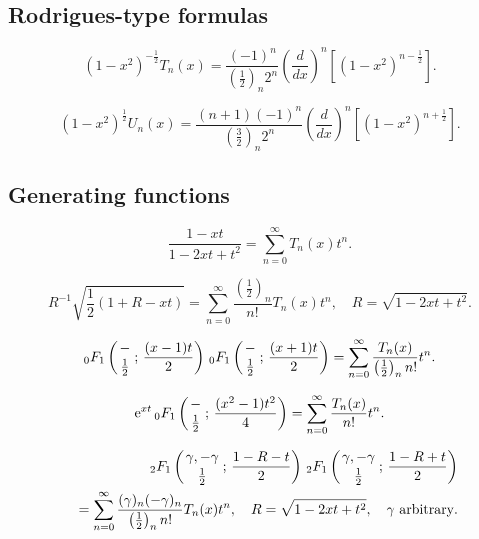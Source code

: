 \documentclass[envcountchap,graybox]{svmono}
\newcommand{\hyp}[5]{\mbox{}_{#1}{F}_{#2}
\left(\genfrac{}{}{0pt}{}{#3}{#4}\,;\,#5\right)}
\newcommand{\e}{\textrm{e}}
\begin{document}
\subsection*{Rodrigues-type formulas}
\begin{equation}
\label{RodChebyshevI}
(1-x^2)^{-\frac{1}{2}}T_n(x)=\frac{(-1)^n}{(\frac{1}{2})_n2^n}
\left(\frac{d}{dx}\right)^n\left[(1-x^2)^{n-\frac{1}{2}}\right].
\end{equation}

\begin{equation}
\label{RodChebyshevII}
(1-x^2)^{\frac{1}{2}}U_n(x)=\frac{(n+1)(-1)^n}{(\frac{3}{2})_n2^n}
\left(\frac{d}{dx}\right)^n\left[(1-x^2)^{n+\frac{1}{2}}\right].
\end{equation}

\subsection*{Generating functions}
\begin{equation}
\label{GenChebyshevI1}
\frac{1-xt}{1-2xt+t^2}=\sum_{n=0}^{\infty}T_n(x)t^n.
\end{equation}

\begin{equation}
\label{GenChebyshevI2}
R^{-1}\sqrt{\frac{1}{2}(1+R-xt)}=\sum_{n=0}^{\infty}
\frac{\left(\frac{1}{2}\right)_n}{n!}T_n(x)t^n,\quad R=\sqrt{1-2xt+t^2}.
\end{equation}

\begin{equation}
\label{GenChebyshevI3}
\hyp{0}{1}{-}{\frac{1}{2}}{\frac{(x-1)t}{2}}\,
\hyp{0}{1}{-}{\frac{1}{2}}{\frac{(x+1)t}{2}}=
\sum_{n=0}^{\infty}\frac{T_n(x)}{\left(\frac{1}{2}\right)_nn!}t^n.
\end{equation}

\begin{equation}
\label{GenChebyshevI4}
\e^{xt}\,\hyp{0}{1}{-}{\frac{1}{2}}{\frac{(x^2-1)t^2}{4}}=
\sum_{n=0}^{\infty}\frac{T_n(x)}{n!}t^n.
\end{equation}

\begin{eqnarray}
\label{GenChebyshevI5}
& &\hyp{2}{1}{\gamma,-\gamma}{\frac{1}{2}}{\frac{1-R-t}{2}}\,
\hyp{2}{1}{\gamma,-\gamma}{\frac{1}{2}}{\frac{1-R+t}{2}}\nonumber\\
& &{}=\sum_{n=0}^{\infty}\frac{(\gamma)_n(-\gamma)_n}{\left(\frac{1}{2}\right)_nn!}T_n(x)t^n,
\quad R=\sqrt{1-2xt+t^2},\quad\textrm{$\gamma$ arbitrary}.
\end{eqnarray}
\end{document}
